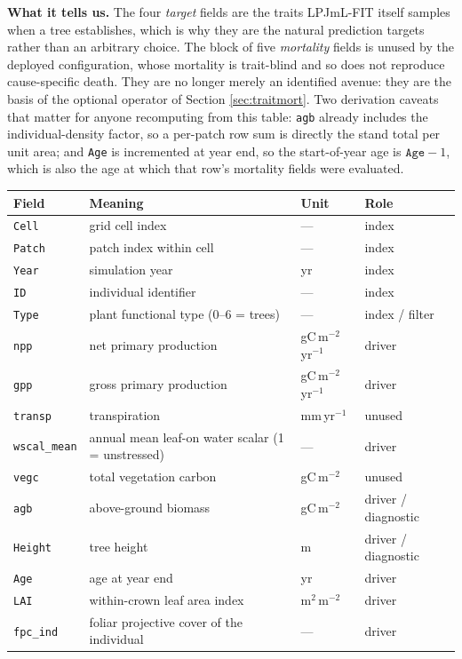\documentclass[11pt]{article}
\begin{document}
\begin{table}[h]
{\textbf{What it tells us.} The four \emph{target} fields are the traits LPJmL-FIT itself samples when a tree establishes, which is why they are the natural prediction targets rather than an arbitrary choice. The block of five \emph{mortality} fields is unused by the deployed configuration, whose mortality is trait-blind and so does not reproduce cause-specific death. They are no longer merely an identified avenue: they are the basis of the optional operator of Section \ref{sec:traitmort}. Two derivation caveats that matter for anyone recomputing from this table: \texttt{agb} already includes the individual-density factor, so a per-patch row sum is directly the stand total per unit area; and \texttt{Age} is incremented at year end, so the start-of-year age is $\texttt{Age}-1$, which is also the age at which that row's mortality fields were evaluated.}
\label{tab:recorded}
\small
\begin{tabular}{llll}
\toprule
Field & Meaning & Unit & Role \\
\midrule
\texttt{Cell} & grid cell index & --- & index \\
\texttt{Patch} & patch index within cell & --- & index \\
\texttt{Year} & simulation year & yr & index \\
\texttt{ID} & individual identifier & --- & index \\
\texttt{Type} & plant functional type (0--6 = trees) & --- & index / filter \\
\midrule
\texttt{npp} & net primary production & gC\,m$^{-2}$\,yr$^{-1}$ & driver \\
\texttt{gpp} & gross primary production & gC\,m$^{-2}$\,yr$^{-1}$ & driver \\
\texttt{transp} & transpiration & mm\,yr$^{-1}$ & unused \\
\texttt{wscal\_mean} & annual mean leaf-on water scalar (1 = unstressed) & --- & driver \\
\texttt{vegc} & total vegetation carbon & gC\,m$^{-2}$ & unused \\
\texttt{agb} & above-ground biomass & gC\,m$^{-2}$ & driver / diagnostic \\
\texttt{Height} & tree height & m & driver / diagnostic \\
\texttt{Age} & age at year end & yr & driver \\
\texttt{LAI} & within-crown leaf area index & m$^2$\,m$^{-2}$ & driver \\
\texttt{fpc\_ind} & foliar projective cover of the individual & --- & driver \\

\end{tabular}
\end{table}
\end{document}
